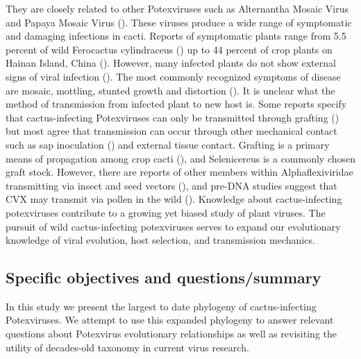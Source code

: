 \documentclass[11pt,letterpaper,titlepage]{article}
\begin{document}
\begin{linenumbers}
They are closely related to other Potexviruses such as Alternantha Mosaic Virus and Papaya Mosaic Virus (\cite{martelli_family_2007, park_detection_2018, liou_complete_2004}). 
These viruses produce a wide range of symptomatic and damaging infections in cacti. 
Reports of symptomatic plants range from 5.5 percent of wild Ferocactus cylindraceus (\cite{attathom_occurrence_1978}) up to 44 percent of crop plants on Hainan Island, China (\cite{peng_molecular_2016}). 
However, many infected plants do not show external signs of viral infection (\cite{liou_complete_2004, bos_symptoms_1977}). 
The most commonly recognized symptoms of disease are mosaic, mottling, stunted growth and distortion (\cite{maliarenko_cactus_2013, peng_molecular_2016, attathom_occurrence_1978}). 
It is unclear what the method of transmission from infected plant to new host is. 
Some reports specify that cactus-infecting Potexviruses can only be transmitted through grafting (\cite{duarte_potexvirus_2008, martelli_family_2007}) but most agree that transmission can occur through other mechanical contact such as sap inoculation (\cite{liou_complete_2004, maliarenko_cactus_2013, park_detection_2018}) and external tissue contact. 
Grafting is a primary means of propagation among crop cacti (\cite{park_detection_2018}), and Selenicereus is a commonly chosen graft stock. 
However, there are reports of other members within Alphaflexiviridae transmitting via insect and seed vectors (\cite{martelli_family_2007}), and pre-DNA studies suggest that CVX may transmit via pollen in the wild (\cite{attathom_occurrence_1978}).
Knowledge about cactus-infecting potexviruses contribute to a growing yet biased study of plant viruses. 
The pursuit of wild cactus-infecting potexviruses serves to expand our evolutionary knowledge of viral evolution, host selection, and transmission mechanics. 
\subsection*{Specific objectives and questions/summary}
In this study we present the largest to date phylogeny of cactus-infecting Potexviruses. 
We attempt to use this expanded phylogeny to answer relevant questions about Potexvirus evolutionary relationships as well as revisiting the utility of decades-old taxonomy in current virus research. 


\end{linenumbers}
\end{document}
